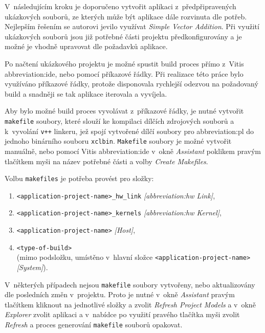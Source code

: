 \documentclass[a4paper, twoside, 11pt]{article}
\begin{document}
		V~následujícím kroku je doporučeno vytvořit aplikaci z~předpřipravených ukázkových souborů, ze kterých může být aplikace dále rozvinuta dle potřeb. Nejlepším řešením se autorovi jevilo využívat \textit{Simple Vector Addition}. Při využití ukázkových souborů jsou již potřebné části projektu předkonfigurovány a je možné je vhodně upravovat dle požadavků aplikace.\par
		Po načtení ukázkového projektu je možné spustit build proces přímo z~Vitis \gls{abbreviation:ide}, nebo pomocí příkazové řádky. Při realizace této práce bylo využíváno příkazové řádky, protože disponovala rychlejší odezvou na požadovaný build a snadněji se tak aplikace iterovala a vyvíjela.\par
		Aby bylo možné build proces vyvolávat z~příkazové řádky, je nutné vytvořit \texttt{makefile} soubory, které slouží ke kompilaci dílčích zdrojových souborů a k~vyvolání \texttt{v++} linkeru, jež spojí vytvořené dílčí soubory pro \gls{abbreviation:pl} do jednoho binárního souboru \texttt{xclbin}. \texttt{Makefile} soubory je možné vytvořit manuálně, nebo pomocí Vitis \gls{abbreviation:ide} v~okně \textit{Assistant} poklikem pravým tlačítkem myši na název potřebné části a volby \textit{Create Makefiles}.\par
		\vspace*{0.35cm}
		Volbu \texttt{makefiles} je potřeba provést pro složky:
		\begin{enumerate}
			\item \texttt{<application-project-name>\_hw\_link} \textit{[\gls{abbreviation:hw} Link]},
			\item \texttt{<application-project-name>\_kernels} \textit{[\gls{abbreviation:hw} Kernel]},
			\item \texttt{<application-project-name>} \textit{[Host]},
			\item \texttt{<type-of-build>}\\(mimo podsložku, umístěno v~hlavní složce \texttt{<application-project-name>} \textit{[System]}).
		\end{enumerate}
		\vspace*{0.75cm}
		V~některých případech nejsou \texttt{makefile} soubory vytvořeny, nebo aktualizovány dle posledních změn v~projektu. Proto je nutné v~okně \textit{Assistant} pravým tlačítkem kliknout na jednotlivé složky a zvolit \textit{Refresh Project Models} a v~okně \textit{Explorer} zvolit aplikaci a v~nabídce po využití pravého tlačítka myši zvolit \textit{Refresh} a proces generování \texttt{makefile} souborů opakovat.\par
\end{document}
